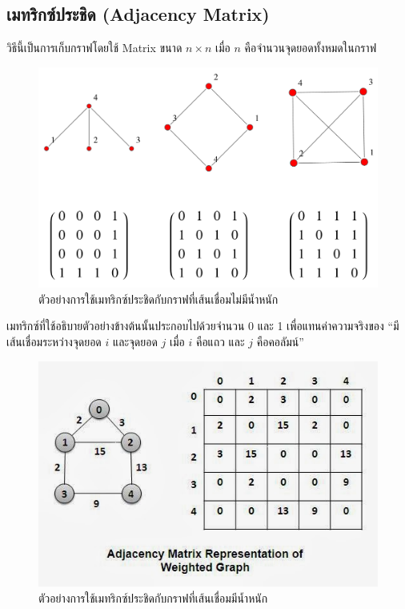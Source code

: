 \subsection{เมทริกซ์ประชิด (Adjacency Matrix)}

วิธีนี้เป็นการเก็บกราฟโดยใช้ Matrix ขนาด $n \times n$ เมื่อ $n$ คือจำนวนจุดยอดทั้งหมดในกราฟ

\begin{figure}[h!]
	\centering
    \includegraphics[width=13cm]{images/adjacency-matrix}
	\caption{ตัวอย่างการใช้เมทริกซ์ประชิดกับกราฟที่เส้นเชื่อมไม่มีน้ำหนัก}
    \label{fig:adjacency_matrix}
\end{figure}

เมทริกซ์ที่ใช้อธิบายตัวอย่างข้างต้นนั้นประกอบไปด้วยจำนวน 0 และ 1 เพื่อแทนค่าความจริงของ ``มีเส้นเชื่อมระหว่างจุดยอด $i$  และจุดยอด $j$ เมื่อ $i$ คือแถว และ $j$ คือคอลัมน์''

\newpage

\begin{figure}[h!]
	\centering
    \includegraphics[width=13cm]{images/adjacency-matrix-weighted}
	\caption{ตัวอย่างการใช้เมทริกซ์ประชิดกับกราฟที่เส้นเชื่อมมีน้ำหนัก}
    \label{fig:adjacency_matrix_weighted}
\end{figure}

